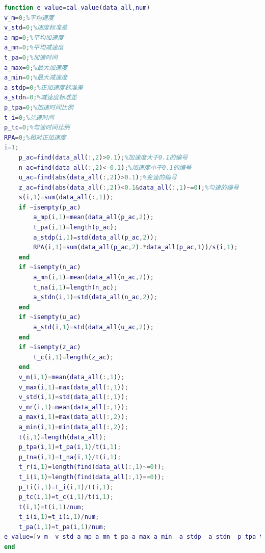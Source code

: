 \documentclass[bwprint]{gmcmthesis}
\begin{document}
\begin{lstlisting}[language=Matlab]%设置不同语言即可。
function e_value=cal_value(data_all,num)
v_m=0;%平均速度
v_std=0;%速度标准差
a_mp=0;%平均加速度
a_mn=0;%平均减速度
t_pa=0;%加速时间
a_max=0;%最大加速度
a_min=0;%最大减速度
a_stdp=0;%正加速度标准差
a_stdn=0;%减速度标准差
p_tpa=0;%加速时间比例
t_i=0;%怠速时间
p_tc=0;%匀速时间比例
RPA=0;%相对正加速度
i=1;
    p_ac=find(data_all(:,2)>0.1);%加速度大于0.1的编号
    n_ac=find(data_all(:,2)<-0.1);%加速度小于0.1的编号
    u_ac=find(abs(data_all(:,2))>0.1);%变速的编号
    z_ac=find(abs(data_all(:,2))<0.1&data_all(:,1)~=0);%匀速的编号
    s(i,1)=sum(data_all(:,1));
    if ~isempty(p_ac)
        a_mp(i,1)=mean(data_all(p_ac,2));
        t_pa(i,1)=length(p_ac);
        a_stdp(i,1)=std(data_all(p_ac,2));
        RPA(i,1)=sum(data_all(p_ac,2).*data_all(p_ac,1))/s(i,1);
    end
    if ~isempty(n_ac)
        a_mn(i,1)=mean(data_all(n_ac,2));
        t_na(i,1)=length(n_ac);
        a_stdn(i,1)=std(data_all(n_ac,2));
    end
    if ~isempty(u_ac)
        a_std(i,1)=std(data_all(u_ac,2));
    end
    if ~isempty(z_ac)
        t_c(i,1)=length(z_ac);
    end
    v_m(i,1)=mean(data_all(:,1));
    v_max(i,1)=max(data_all(:,1));
    v_std(i,1)=std(data_all(:,1));
    v_mr(i,1)=mean(data_all(:,1));
    a_max(i,1)=max(data_all(:,2));
    a_min(i,1)=min(data_all(:,2));
    t(i,1)=length(data_all);
    p_tpa(i,1)=t_pa(i,1)/t(i,1);
    p_tna(i,1)=t_na(i,1)/t(i,1);
    t_r(i,1)=length(find(data_all(:,1)~=0));
    t_i(i,1)=length(find(data_all(:,1)==0));
    p_ti(i,1)=t_i(i,1)/t(i,1);
    p_tc(i,1)=t_c(i,1)/t(i,1);
    t(i,1)=t(i,1)/num;
    t_i(i,1)=t_i(i,1)/num;
    t_pa(i,1)=t_pa(i,1)/num;
e_value=[v_m  v_std a_mp a_mn t_pa a_max a_min  a_stdp  a_stdn  p_tpa t_i p_tc RPA];%特征值矩阵
end
 \end{lstlisting}
\end{document}

